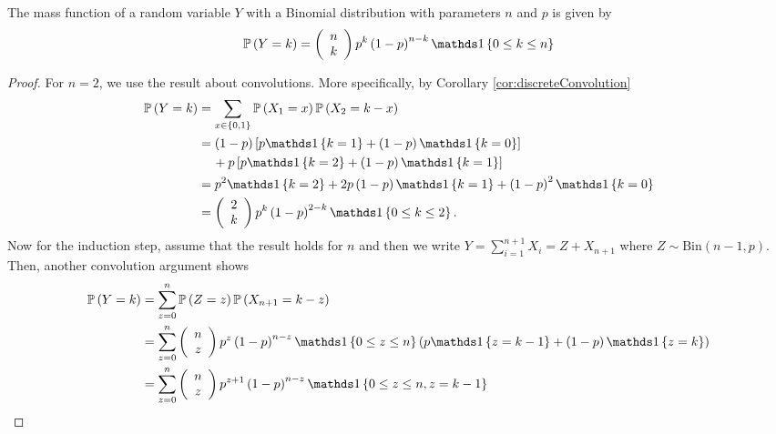 \begin{prop}
\label{prop:binomialCDF}The mass function of a random variable $Y$
with a Binomial distribution with parameters $n$ and $p$ is given
by
\[
\P\left(Y=k\right)=\left(\begin{array}{c}
n\\
k
\end{array}\right)p^{k}\left(1-p\right)^{n-k}\indicate\left\{ 0\leq k\leq n\right\} 
\]
\end{prop}

\begin{proof}
For $n=2$, we use the result about convolutions. More specifically,
by Corollary \ref{cor:discreteConvolution}
\begin{align*}
\P\left(Y=k\right) & =\sum_{x\in\left\{ 0,1\right\} }\P\left(X_{1}=x\right)\P\left(X_{2}=k-x\right)\\
 & =\left(1-p\right)\left[p\indicate\left\{ k=1\right\} +\left(1-p\right)\indicate\left\{ k=0\right\} \right]\\
 & \ \ \ \!\ +p\left[p\indicate\left\{ k=2\right\} +\left(1-p\right)\indicate\left\{ k=1\right\} \right]\\
 & =p^{2}\indicate\left\{ k=2\right\} +2p\left(1-p\right)\indicate\left\{ k=1\right\} +\left(1-p\right)^{2}\indicate\left\{ k=0\right\} \\
 & =\left(\begin{array}{c}
2\\
k
\end{array}\right)p^{k}\left(1-p\right)^{2-k}\indicate\left\{ 0\leq k\leq2\right\} .
\end{align*}
Now for the induction step, assume that the result holds for $n$
and then we write $Y=\sum_{i=1}^{n+1}X_{i}=Z+X_{n+1}$ where $Z\sim\textrm{Bin}\left(n-1,p\right)$.
Then, another convolution argument shows
\begin{align*}
\P\left(Y=k\right) & =\sum_{z=0}^{n}\P\left(Z=z\right)\P\left(X_{n+1}=k-z\right)\\
 & =\sum_{z=0}^{n}\left(\begin{array}{c}
n\\
z
\end{array}\right)p^{z}\left(1-p\right)^{n-z}\indicate\left\{ 0\leq z\leq n\right\} \left(p\indicate\left\{ z=k-1\right\} +\left(1-p\right)\indicate\left\{ z=k\right\} \right)\\
 & =\sum_{z=0}^{n}\left(\begin{array}{c}
n\\
z
\end{array}\right)p^{z+1}\left(1-p\right)^{n-z}\indicate\left\{ 0\leq z\leq n,z=k-1\right\} \\

\end{align*}
\end{proof}
